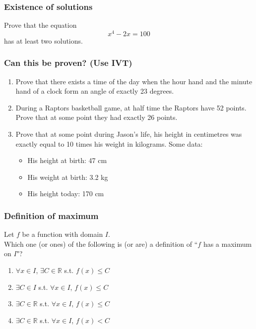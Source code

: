 \documentclass[14pt]{beamer}
\newcommand {\DS} [1] {${\displaystyle #1}$}
\newcommand {\R}{\mathbb{R}}
\newcommand{\setsize}[1]{\fontsize{#1}{#1}\selectfont} %
\newcommand{\smallerfont}{\setsize{13}} %
\begin{document}
\begin{frame}
\frametitle{Existence of solutions}

Prove that the equation 
	$$
		x^4 - 2x = 100
	$$
has at least two solutions.

\end{frame}
\begin{frame}[t]
\frametitle{Can this be proven? (Use IVT)}
\smallerfont
\begin{enumerate}
\item  Prove that there exists a time of the day when the hour hand and the minute hand of a clock form an angle of exactly 23 degrees.

\vfill
\item  During a Raptors basketball game, at half time the Raptors have 52 points.  Prove that at some point they had exactly 26 points.

 \vfill
\item  Prove that at some point during Jason's life, his height in centimetres was exactly equal to 10 times his weight in kilograms.  Some data:
	\begin{itemize}
		\item  His height at birth: 47 cm
		\item  His weight at birth: 3.2 kg
		\item  His height today: 170 cm
	\end{itemize}
\vfill
\end{enumerate}

\end{frame}


\begin{frame}
\frametitle{Definition of maximum}

Let $f$ be a function with domain $I$.  \\
Which one (or ones) of the following is (or are) a definition of 	\quad
	``$f$ has a maximum on $I$"?

\begin{enumerate}
	\item   \DS{\forall x \in I}, \DS{\exists C \in \R} s.t. \DS{f(x) \leq C}
	\item  \DS{\exists C \in I} s.t. \DS{\forall x \in I}, \DS{f(x) \leq C}
	\item  \DS{\exists C \in \R} s.t. \DS{\forall x \in I}, \DS{f(x) \leq C}
	\item  \DS{\exists C \in \R} s.t. \DS{\forall x \in I}, \DS{f(x) < C}
\end{enumerate}

\end{frame}
\end{document}

